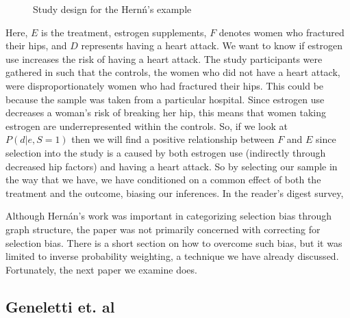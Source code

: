 \documentclass[12pt,twoside]{reedthesis}
\theoremstyle{definition}
\begin{document}
\begin{figure}[H]
\begin{center}
\end{center}
\caption{Study design for the Hern\'n's example}
\end{figure}

Here, $E$ is the treatment, estrogen supplements, $F$ denotes women who fractured their hips, and $D$ represents having a heart attack. We want to know if estrogen use increases the risk of having a heart attack. The study participants were gathered in such that the controls, the women who did not have a heart attack, were disproportionately women who had fractured their hips. This could be because the sample was taken from a particular hospital. Since estrogen use decreases a woman's risk of breaking her hip, this means that women taking estrogen are underrepresented within the controls. So, if we look at $P(d | e, S = 1)$ then we will find a positive relationship between $F$ and $E$ since selection into the study is a caused by both estrogen use (indirectly through decreased hip factors) and having a heart attack. So by selecting our sample in the way that we have, we have conditioned on a common effect of both the treatment and the outcome, biasing our inferences. In the reader's digest survey, 

Although Hern\'an's work was important in categorizing selection bias through graph structure, the paper was not primarily concerned with correcting for selection bias. There is a short section on how to overcome such bias, but it was limited to inverse probability weighting, a technique we have already discussed. Fortunately, the next paper we examine does. 



\subsection{Geneletti et. al}
\end{document}
